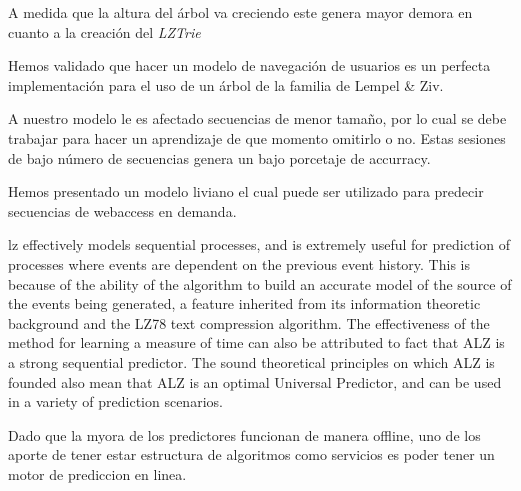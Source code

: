 A medida que la altura del árbol va creciendo este genera mayor demora en cuanto a la creación del \emph{LZTrie}

Hemos validado que hacer un modelo de navegación de usuarios es un perfecta implementación para el uso de un árbol de la familia de Lempel \& Ziv.

A nuestro modelo le es afectado secuencias de menor tamaño, por lo cual se debe trabajar para hacer un aprendizaje de que momento omitirlo o no. Estas sesiones de bajo número de secuencias genera un bajo porcetaje de accurracy. 



Hemos presentado un modelo liviano el cual puede ser utilizado para predecir secuencias de webaccess en demanda.










%

lz effectively models sequential processes, and is extremely useful for prediction of processes where events are dependent on the previous event history. This is because of the ability of the algorithm to build an accurate model of the source of the events being generated, a feature inherited from its information theoretic background and the LZ78 text compression algorithm. 
%
The effectiveness of the method for learning a measure of time can also be attributed to fact that ALZ is a strong sequential predictor. The sound theoretical principles on which ALZ is founded also mean that ALZ is an optimal Universal Predictor, and can be used in a variety of prediction scenarios.
%

Dado que la myora de los predictores funcionan de 
manera offline, uno de los aporte de tener estar estructura de algoritmos como servicios es poder tener un motor de prediccion en linea.
